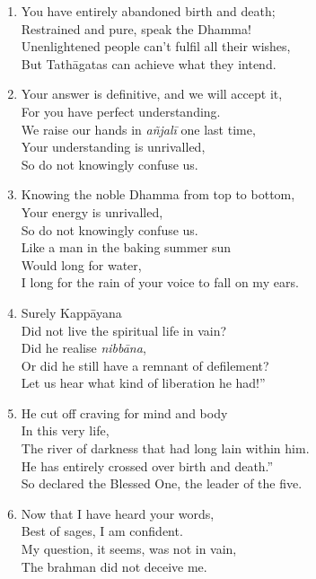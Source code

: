 \documentclass[10pt, openany]{book}
\newcommand*{\vleftofline}[1]{\leavevmode\llap{#1}}
\begin{document}
\begin{enumerate}
\item You have entirely abandoned birth and death;\\
Restrained and pure, speak the Dhamma!\\
Unenlightened people can’t fulfil all their wishes,\\
But Tathāgatas can achieve what they intend.

\item Your answer is definitive, and we will accept it,\\
For you have perfect understanding.\\
We raise our hands in \emph{añjalī} one last time,\\
Your understanding is unrivalled,\\
So do not knowingly confuse us.

\item Knowing the noble Dhamma from top to bottom,\\
Your energy is unrivalled, \\
So do not knowingly confuse us.\\
Like a man in the baking summer sun \\
Would long for water,\\
I long for the rain of your voice to fall on my ears.

\item Surely Kappāyana\\
Did not live the spiritual life in vain?\\
Did he realise \emph{nibbāna},\\
Or did he still have a remnant of defilement?\\
Let us hear what kind of liberation he had!”

\item \vleftofline{“}He cut off craving for mind and body \\
In this very life,\\
The river of darkness that had long lain within him.\\
He has entirely crossed over birth and death.”\\
So declared the Blessed One, the leader of the five.

\item \vleftofline{“}Now that I have heard your words,\\
Best of sages, I am confident.\\
My question, it seems, was not in vain,\\
The brahman did not deceive me.


\end{enumerate}
\end{document}
